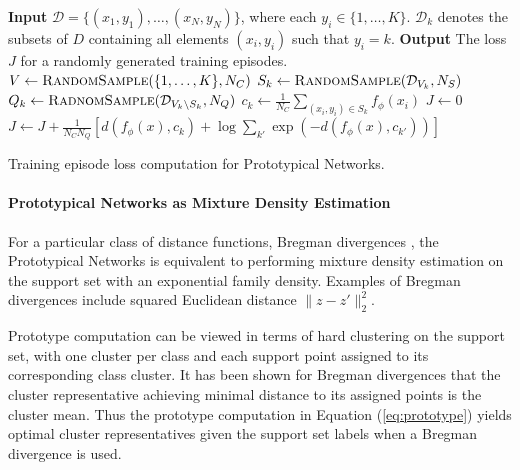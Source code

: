 \documentclass{article}
\begin{document}
\begin{algorithm}
\begin{algorithmic}
\State \textbf{Input} $\mathcal{D}=\{(x_1,y_1),\dots,(x_N,y_N) \}$, where each $y_i\in\{1,\dots,K\}$. $\mathcal{D}_k$ denotes the subsets of $D$ containing all elements $(x_i,y_i)$ such that $y_i=k$.
\State \textbf{Output} The loss $J$ for a randomly generated training episodes.
\State $V\gets \textsc{RandomSample}(\{1,\dots,K\},N_C)$ 
    \State $S_k\gets\textsc{RandomSample}(\mathcal{D}_{V_k},N_S)$ 
    \State $Q_k\gets\textsc{RadnomSample}(\mathcal{D}_{V_k\setminus S_k},N_Q)$ 
    \State $c_k\gets\frac{1}{N_C}\sum_{(x_i,y_i)\in S_k} f_{\phi}(x_i)$ 
\EndFor
\State $J\gets 0$ 
\State $J\gets J+\frac{1}{N_C N_Q}\left[d(f_{\phi}(x),c_k)+\log\sum_{k'}\exp(-d(f_{\phi}(x),c_{k'})) \right]$ 
\EndFor
\EndFor
\end{algorithmic}
\caption{Training episode loss computation for Prototypical Networks.}
\end{algorithm}

\paragraph{Prototypical Networks as Mixture Density Estimation} For a particular class of distance functions, Bregman divergences \cite{banerjee2005clustering}, the Prototypical Networks is equivalent to performing mixture density estimation on the support set with an exponential family density. Examples of Bregman divergences include squared Euclidean distance $\|z-z'\|_2^2$.

Prototype computation can be viewed in terms of hard clustering on the support set, with one cluster per class and each support point assigned to its corresponding class cluster. It has been shown for Bregman divergences that the cluster representative achieving minimal distance to its assigned points is the cluster mean. Thus the prototype computation in Equation (\ref{eq:prototype}) yields optimal cluster representatives given the support set labels when a Bregman divergence is used.
\end{document}
